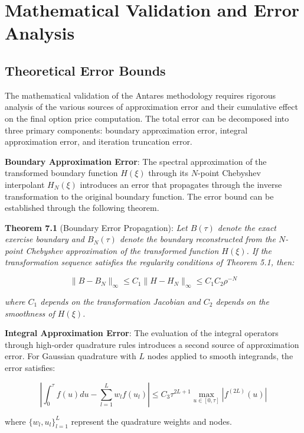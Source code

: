 \documentclass[
  american,
  11pt,
  11pt,
  letterpaper,
  onecolumn]{article}
\begin{document}
\section{Mathematical Validation and Error
Analysis}\label{mathematical-validation-and-error-analysis}

\subsection{Theoretical Error Bounds}\label{theoretical-error-bounds}

The mathematical validation of the Antares methodology requires rigorous
analysis of the various sources of approximation error and their
cumulative effect on the final option price computation. The total error
can be decomposed into three primary components: boundary approximation
error, integral approximation error, and iteration truncation error.

\textbf{Boundary Approximation Error}: The spectral approximation of the
transformed boundary function \(H(\xi)\) through its \(N\)-point
Chebyshev interpolant \(H_N(\xi)\) introduces an error that propagates
through the inverse transformation to the original boundary function.
The error bound can be established through the following theorem.

\textbf{Theorem 7.1} (Boundary Error Propagation): \emph{Let \(B(\tau)\)
denote the exact exercise boundary and \(B_N(\tau)\) denote the boundary
reconstructed from the \(N\)-point Chebyshev approximation of the
transformed function \(H(\xi)\). If the transformation sequence
satisfies the regularity conditions of Theorem 5.1, then:}

\[\|B - B_N\|_{\infty} \leq C_1 \|H - H_N\|_{\infty} \leq C_1 C_2 \rho^{-N} \tag{7.1}\]

\emph{where \(C_1\) depends on the transformation Jacobian and \(C_2\)
depends on the smoothness of \(H(\xi)\).}

\textbf{Integral Approximation Error}: The evaluation of the integral
operators through high-order quadrature rules introduces a second source
of approximation error. For Gaussian quadrature with \(L\) nodes applied
to smooth integrands, the error satisfies:

\[\left|\int_0^\tau f(u) du - \sum_{l=1}^{L} w_l f(u_l)\right| \leq C_3 \tau^{2L+1} \max_{u \in [0,\tau]} |f^{(2L)}(u)| \tag{7.2}\]

where \(\{w_l, u_l\}_{l=1}^{L}\) represent the quadrature weights and
nodes.
\end{document}
